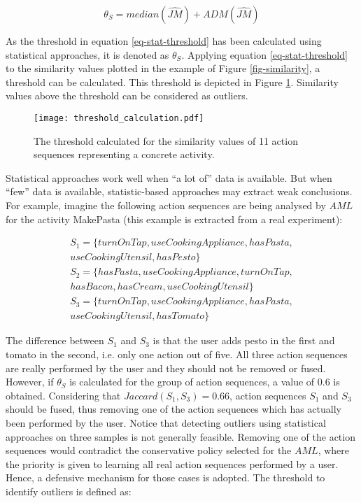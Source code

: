 \begin{equation}
\label{eq-stat-threshold}
 \theta_S = median(\hat{JM}) + ADM(\hat{JM})
\end{equation}

As the threshold in equation \ref{eq-stat-threshold} has been calculated using statistical approaches, it is denoted as $\theta_S$. Applying equation \ref{eq-stat-threshold} to the similarity values plotted in the example of Figure \ref{fig-similarity}, a threshold can be calculated. This threshold is depicted in Figure \ref{fig-threshold-calc}. Similarity values above the threshold can be considered as outliers. 

\begin{figure}[htbp]
\centering
\texttt{[image: threshold\_calculation.pdf]}
    \caption{The threshold calculated for the similarity values of 11 action sequences representing a concrete activity.}
    \label{fig-threshold-calc}
\end{figure}

Statistical approaches work well when ``a lot of'' data is available. But when ``few'' data is available, statistic-based approaches may extract weak conclusions. For example, imagine the following action sequences are being analysed by $AML$ for the activity MakePasta (this example is extracted from a real experiment):

\begin{equation*}
 \begin{split}
  S_1 = \{ turnOnTap, useCookingAppliance, hasPasta,\\ useCookingUtensil, hasPesto \} \\
  S_2 = \{ hasPasta, useCookingAppliance, turnOnTap,\\ hasBacon, hasCream, useCookingUtensil \} \\
  S_3 = \{ turnOnTap, useCookingAppliance, hasPasta,\\ useCookingUtensil, hasTomato \}
 \end{split}
\end{equation*}

The difference between $S_1$ and $S_3$ is that the user adds pesto in the first and tomato in the second, i.e. only one action out of five. All three action sequences are really performed by the user and they should not be removed or fused. However, if $\theta_S$ is calculated for the group of action sequences, a value of 0.6 is obtained. Considering that $Jaccard(S_1, S_3) = 0.66$, action sequences $S_1$ and $S_3$ should be fused, thus removing one of the action sequences which has actually been performed by the user. Notice that detecting outliers using statistical approaches on three samples is not generally feasible. Removing one of the action sequences would contradict the conservative policy selected for the $AML$, where the priority is given to learning all real action sequences performed by a user. Hence, a defensive mechanism for those cases is adopted. The threshold to identify outliers is defined as:

